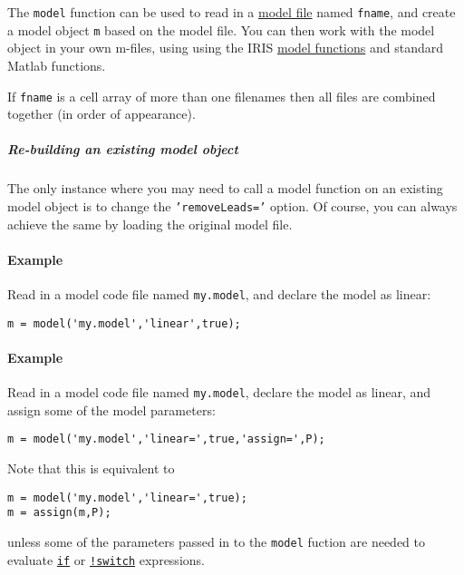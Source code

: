 The \texttt{model} function can be used to read in a
\href{modellang/Contents}{model file} named \texttt{fname}, and create a
model object \texttt{m} based on the model file. You can then work with
the model object in your own m-files, using using the IRIS
\href{model/Contents}{model functions} and standard Matlab functions.

If \texttt{fname} is a cell array of more than one filenames then all
files are combined together (in order of appearance).

\subparagraph{Re-building an existing model
object}

The only instance where you may need to call a model function on an
existing model object is to change the \texttt{'removeLeads='} option.
Of course, you can always achieve the same by loading the original model
file.

\paragraph{Example}

Read in a model code file named \texttt{my.model}, and declare the model
as linear:

\begin{verbatim}
m = model('my.model','linear',true);
\end{verbatim}

\paragraph{Example}

Read in a model code file named \texttt{my.model}, declare the model as
linear, and assign some of the model parameters:

\begin{verbatim}
m = model('my.model','linear=',true,'assign=',P);
\end{verbatim}

Note that this is equivalent to

\begin{verbatim}
m = model('my.model','linear=',true);
m = assign(m,P);
\end{verbatim}

unless some of the parameters passed in to the \texttt{model} fuction
are needed to evaluate \href{modellang/if}{\texttt{if}} or
\href{modellang/switch}{\texttt{!switch}} expressions.


